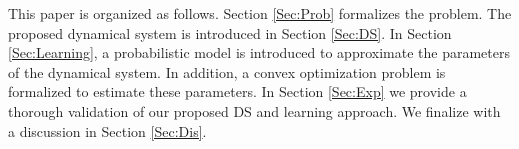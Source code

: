 \documentclass[letterpaper, 10 pt, journal, twoside, fleqn]{IEEEtran}
\begin{document}
This paper is organized as follows. Section \ref{Sec:Prob} formalizes the problem. The proposed dynamical system is introduced in Section \ref{Sec:DS}. In Section \ref{Sec:Learning}, a probabilistic model is introduced to approximate the parameters of the dynamical system. In addition, a convex optimization problem is  formalized to estimate these parameters. In Section \ref{Sec:Exp} we provide a thorough validation of our proposed DS and learning approach. We finalize with a discussion in Section \ref{Sec:Dis}.

\end{document}
